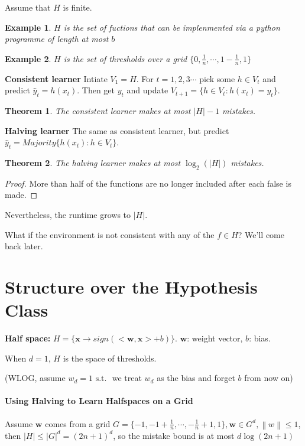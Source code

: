 \documentclass{book}
\newcommand{\st}{\text{ s.t. }}
\newcommand{\nm}[1]{\left\|#1\right\|}
\newtheorem{Thm}{Theorem}[section]
\newtheorem{Eg}{Example}[section]
\begin{document}
Assume that $H$ is finite.
\begin{Eg}
$H$ is the set of fuctions that can be implenmented via a python programme of length at most $b$
\end{Eg}

\begin{Eg}
  $H$ is the set of thresholds over a grid $\{0,\frac{1}{n},\cdots,1-\frac{1}{n},1\}$
\end{Eg}

\textbf{Consistent learner} Intiate $V_{1}=H$. For $t=1,2,3\cdots$ pick some $h\in V_{t}$ and predict $\hat y_{t}=h(x_{t})$. Then get $y_{t}$ and update $V_{t+1}=\{h\in V_{t}: h(x_{t})=y_{t}\}$.
\begin{Thm}
The consistent learner makes at most $|H|-1$ mistakes.
\end{Thm}

\textbf{Halving learner} The same as consistent learner, but predict $\hat y_{t}=Majority\{h(x_{t}):h\in V_{t}\}$.
\begin{Thm}
  The halving learner makes at most $\log_{2}(|H|)$ mistakes.
\end{Thm}

\begin{proof}
  More than half of the functions are no longer included after each false is made.
\end{proof}
Nevertheless, the runtime grows to $|H|$. 

\small{What if the environment is not consistent with any of the $f\in H$? We'll come back later.}

\section{Structure over the Hypothesis Class}

\textbf{Half space:} $H=\{\bm{x}\to sign(<\bm{w},\bm{x}>+b)\}$. $\bm{w}$: weight vector, $b$: bias.

When $d=1$, $H$ is the space of thresholds.

(WLOG, assume $w_{d}=1\st$ we treat $w_{d}$ as the bias and forget $b$ from now on)

\paragraph{Using Halving to Learn Halfspaces on a Grid}Assume $\bm{w}$ comes from a grid $G=\{-1,-1+\frac 1 n,\cdots,-\frac{1}{n}+1,1\}, \bm{w}\in G^{d}, \nm{w}\leq 1$, then $|H|\leq |G|^{d}=(2n+1)^{d}$, so the mistake bound is at most $d\log(2n+1)$ 
\end{document}
